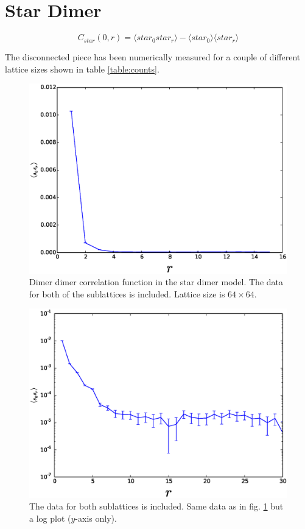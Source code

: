 \documentclass[aps,floatfix,11pt]{revtex4-1}
\begin{document}
\section{Star Dimer}

\begin{equation}
    \label{}
    C_{star}(0,r) =  \langle star_0 star_r \rangle -\langle star_0 \rangle \langle star_r \rangle
\end{equation}

\noindent
The disconnected piece has been numerically measured for a couple of different lattice sizes shown
in table \ref{table:counts}.

%

\begin{figure}[h]
    \centering
    \includegraphics[width=8.5 cm]{s_dimer_dimer_cor}
    \caption{Dimer dimer correlation function in the star dimer model. The data for both of the
        sublattices is included. Lattice size is $64\times
    64$. \label{fig:s_dimer_dimer}}
\end{figure}

\begin{figure}[h]
    \centering
    \includegraphics[width=8.5 cm]{s_dimer_dimer_cor_log_both_sublat}
    \caption{The data for both sublattices is included. Same data as in fig. \ref{fig:s_dimer_dimer} but a log plot ($y$-axis only).
    \label{fig:s_dimer_dimer_log}}
\end{figure}
\end{document}
